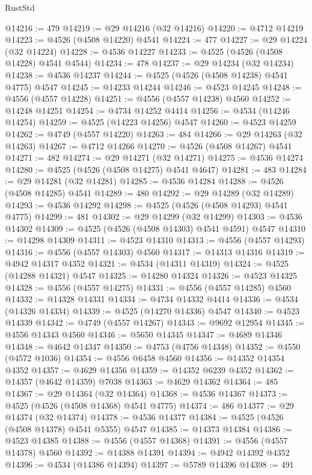 \begin{lexlean}{RustStd}
\begin{coremodule}
{\begin{coremodule}
{{{{{{{{{{{{{{{{{{{{{{{{{{{{{{{{{{{{{{{{{{{{{{{{{{{{{{{@14216 := 479
@14219 := @29 @14216 (@32 @14216)
@14220 := @4712 @14219
@14223 := @4526 (@4508 @14220) @4541
@14224 := 477
@14227 := @29 @14224 (@32 @14224)
@14228 := @4536 @14227
@14233 := @4525 (@4526 (@4508 @14228) @4541 @4544)
@14234 := 478
@14237 := @29 @14234 (@32 @14234)
@14238 := @4536 @14237
@14244 := @4525 (@4526 (@4508 @14238) @4541 @4775) @4547
@14245 := @14233 @14244
@14246 := @4523 @14245
@14248 := @4556 (@4557 @14228)
@14251 := @4556 (@4557 @14238) @4560
@14252 := @14248 @14251
@14254 := @4734 @14252 @4414
@14256 := @4534 (@14246 @14254)
@14259 := @4525 (@14223 @14256) @4547
@14260 := @4523 @14259
@14262 := @4749 (@4557 @14220)
@14263 := 484
@14266 := @29 @14263 (@32 @14263)
@14267 := @4712 @14266
@14270 := @4526 (@4508 @14267) @4541
@14271 := 482
@14274 := @29 @14271 (@32 @14271)
@14275 := @4536 @14274
@14280 := @4525 (@4526 (@4508 @14275) @4541 @4647)
@14281 := 483
@14284 := @29 @14281 (@32 @14281)
@14285 := @4536 @14284
@14288 := @4526 (@4508 @14285) @4541
@14289 := 480
@14292 := @29 @14289 (@32 @14289)
@14293 := @4536 @14292
@14298 := @4525 (@4526 (@4508 @14293) @4541 @4775)
@14299 := 481
@14302 := @29 @14299 (@32 @14299)
@14303 := @4536 @14302
@14309 := @4525 (@4526 (@4508 @14303) @4541 @4591) @4547
@14310 := @14298 @14309
@14311 := @4523 @14310
@14313 := @4556 (@4557 @14293)
@14316 := @4556 (@4557 @14303) @4560
@14317 := @14313 @14316
@14319 := @4942 @14317 @4352
@14321 := @4534 (@14311 @14319)
@14324 := @4525 (@14288 @14321) @4547
@14325 := @14280 @14324
@14326 := @4523 @14325
@14328 := @4556 (@4557 @14275)
@14331 := @4556 (@4557 @14285) @4560
@14332 := @14328 @14331
@14334 := @4734 @14332 @4414
@14336 := @4534 (@14326 @14334)
@14339 := @4525 (@14270 @14336) @4547
@14340 := @4523 @14339
@14342 := @4749 (@4557 @14267)
@14343 := @9692 @12954
@14345 := @4556 @14343 @4560
@14346 := @5650 @14345
@14347 := @4689 @14346
@14348 := @4642 @14347
@14350 := @4753 (@4756 @14348)
@14352 := @4550 (@4572 @1036)
@14354 := @4556 @6458 @4560
@14356 := @14352 @14354 @4352
@14357 := @4629 @14356
@14359 := @14352 @6239 @4352
@14362 := @14357 (@4642 @14359) @7038
@14363 := @4629 @14362
@14364 := 485
@14367 := @29 @14364 (@32 @14364)
@14368 := @4536 @14367
@14373 := @4525 (@4526 (@4508 @14368) @4541 @4775)
@14374 := 486
@14377 := @29 @14374 (@32 @14374)
@14378 := @4536 @14377
@14384 := @4525 (@4526 (@4508 @14378) @4541 @5355) @4547
@14385 := @14373 @14384
@14386 := @4523 @14385
@14388 := @4556 (@4557 @14368)
@14391 := @4556 (@4557 @14378) @4560
@14392 := @14388 @14391
@14394 := @4942 @14392 @4352
@14396 := @4534 (@14386 @14394)
@14397 := @5789 @14396
@14398 := 491
}}}}}}}}}}}}}}}}}}}}}}}}}}}}}}}}}}}}}}}}}}}}}}}}}}}}}}}
\end{coremodule}}
\end{coremodule}
\end{lexlean}
